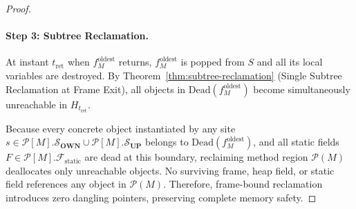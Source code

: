 \documentclass[12pt,a4paper]{article}
\newcommand{\OWN}{\textbf{OWN}}
\newcommand{\UP}{\textbf{UP}}
\begin{document}
\begin{proof}
\paragraph{Step 3: Subtree Reclamation.} At instant $t_{\text{ret}}$ when $f_M^{\text{oldest}}$ returns, $f_M^{\text{oldest}}$ is popped from $S$ and all its local variables are destroyed. By Theorem~\ref{thm:subtree-reclamation} (Single Subtree Reclamation at Frame Exit), all objects in $\text{Dead}(f_M^{\text{oldest}})$ become simultaneously unreachable in $H_{t_{\text{ret}}}$.

Because every concrete object instantiated by any site $s \in \mathcal{P}[M].\mathcal{S}_{\OWN} \cup \mathcal{P}[M].\mathcal{S}_{\UP}$ belongs to $\text{Dead}(f_M^{\text{oldest}})$, and all static fields $F \in \mathcal{P}[M].\mathcal{F}_{\text{static}}$ are dead at this boundary, reclaiming method region $\mathcal{P}(M)$ deallocates only unreachable objects. No surviving frame, heap field, or static field references any object in $\mathcal{P}(M)$. Therefore, frame-bound reclamation introduces zero dangling pointers, preserving complete memory safety.
\end{proof}
\end{document}
